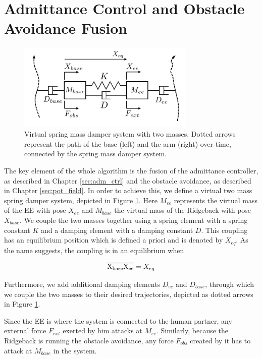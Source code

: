 \section{Admittance Control and Obstacle Avoidance Fusion}
\begin{figure}
   \centering
   \includegraphics[width=0.75\textwidth]{images/admittance_model.jpg}
   \caption{Virtual spring mass damper system with two masses. Dotted arrows represent the path of the base (left) and the arm (right) over time, connected by the spring mass damper system.}
   \label{pics:admittance_model}
\end{figure}
The key element of the whole algorithm is the fusion of the admittance controller, as described in Chapter \ref{sec:adm_ctrl} and the obstacle avoidance, as described in Chapter \ref{sec:pot_field}. In order to achieve this, we define a virtual two mass spring damper system, depicted in Figure \ref{pics:admittance_model}. Here $M_{ee}$ represents the virtual mass of the EE with pose $X_{ee}$ and $M_{base}$ the virtual mass of the Ridgeback with pose $X_{base}$. We couple the two masses together using a spring element with a spring constant $K$ and a damping element with a damping constant $D$. This coupling has an equilibrium position which is defined a priori and is denoted by $X_{eq}$. As the name suggests,  the coupling is in an equilibrium when

\begin{equation}
\overline{\rm X_{base}X_{ee}} = X_{eq}
\end{equation}

Furthermore, we add additional damping elements $D_{ee}$ and $D_{base}$, through which we couple the two masses to their desired trajectories, depicted as dotted arrows in Figure \ref{pics:admittance_model}.

Since the EE is where the system is connected to the human partner, any external force $F_{ext}$ exerted by him attacks at $M_{ee}$. Similarly, because the Ridgeback is running the obstacle avoidance, any force $F_{obs}$ created by it has to attack at $M_{base}$ in the system. 

